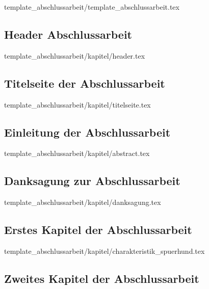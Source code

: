 
	{template_abschlussarbeit/template_abschlussarbeit.tex}


\newpage	
\subsection{Header Abschlussarbeit}
\label{subsec:header}


	{template_abschlussarbeit/kapitel/header.tex}


\newpage
\subsection{Titelseite der Abschlussarbeit}


	{template_abschlussarbeit/kapitel/titelseite.tex}


\newpage	
\subsection{Einleitung der Abschlussarbeit}


	{template_abschlussarbeit/kapitel/abstract.tex}

\subsection{Danksagung zur Abschlussarbeit}


	{template_abschlussarbeit/kapitel/danksagung.tex}


\newpage
\subsection{Erstes Kapitel der Abschlussarbeit}


	{template_abschlussarbeit/kapitel/charakteristik_spuerhund.tex}

\subsection{Zweites Kapitel der Abschlussarbeit}
\label{subsec:zweites_kapitel}

